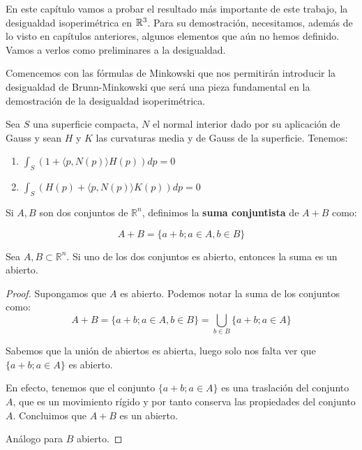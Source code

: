 En este capítulo vamos a probar el resultado más importante de este trabajo, la desigualdad isoperimétrica en $\mathbb{R}^3$. Para su demostración, necesitamos, además de lo visto en capítulos anteriores, algunos elementos que aún no hemos definido. Vamos a verlos como preliminares a la desigualdad.

Comencemos con las fórmulas de Minkowski que nos permitirán introducir la desigualdad de Brunn-Minkowski que será una pieza fundamental en la demostración de la desigualdad isoperimétrica.
\begin{theorem}\label{formulaminkowski}
Sea $S$ una superficie compacta, $N$ el normal interior dado por su aplicación de Gauss y sean $H$ y $K$ las curvaturas media y de Gauss de la superficie. Tenemos:

\begin{enumerate}
    \item $\int_S (1+ \langle p, N(p) \rangle H(p))dp = 0$
    \item $\int_S (H(p)+ \langle p, N(p) \rangle K(p))dp = 0$
\end{enumerate}
\end{theorem}

\begin{definition}
Si $A, B$ son dos conjuntos de $\mathbb{R}^n$, definimos la \textbf{suma conjuntista} de $A+B$ como:

\begin{equation*}
    A+B = \{a+b; a \in A, b \in B\}
\end{equation*}
\end{definition}

\begin{lemma}
Sea $A,B \subset \mathbb{R}^n$. Si uno de los dos conjuntos es abierto, entonces la suma es un abierto.
\end{lemma}
\begin{proof}
Supongamos que $A$ es abierto.
Podemos notar la suma de los conjuntos como:
\begin{equation*}
    A + B = \{a+b; a \in A, b \in B\} = \bigcup_{b \in B} \{a+b; a \in A\}
\end{equation*}

Sabemos que la unión de abiertos es abierta, luego solo nos falta ver que $\{a+b; a \in A\}$ es abierto.

En efecto, tenemos que el conjunto $\{a+b; a \in A\}$ es una traslación del conjunto $A$, que es un movimiento rígido y por tanto conserva las propiedades del conjunto $A$. Concluimos que $A+B$ es un abierto.

Análogo para $B$ abierto.
\end{proof}


